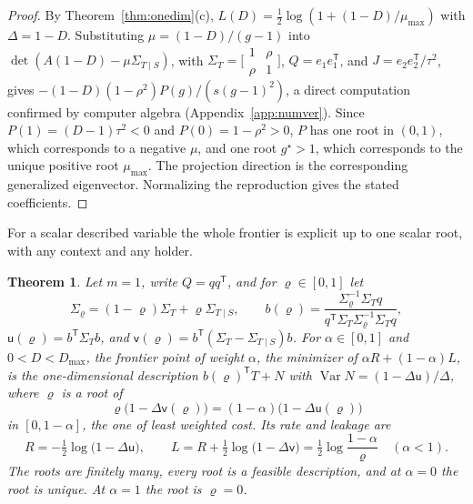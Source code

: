 \documentclass[11pt,onecolumn]{IEEEtran}
\newtheorem{theorem}{Theorem}
\newcommand{\Var}{\operatorname{Var}}
\newcommand{\Kc}{\Sigma_{T\mid S}}
\begin{document}
\begin{proof}
By Theorem~\ref{thm:onedim}(c), $L(D)=\tfrac12\log(1+(1-D)/\mu_{\max})$
with $\Delta=1-D$. Substituting $\mu=(1-D)/(g-1)$ into
$\det(A(1-D)-\mu\Kc)$, with $\Sigma_T=\bigl[\begin{smallmatrix}1&\rho\\ \rho&1\end{smallmatrix}\bigr]$,
$Q=e_1e_1^{\mathsf T}$, and $J=e_2e_2^{\mathsf T}/\tau^2$, gives
$-(1-D)(1-\rho^2)P(g)/(s(g-1)^2)$, a direct computation confirmed by
computer algebra (Appendix~\ref{app:numver}). Since $P(1)=(D-1)\tau^2<0$
and $P(0)=1-\rho^2>0$, $P$ has one root in $(0,1)$, which corresponds to
a negative $\mu$, and one root $g^\star>1$, which corresponds to the
unique positive root $\mu_{\max}$. The projection direction is the
corresponding generalized eigenvector. Normalizing the reproduction
gives the stated coefficients.
\end{proof}

For a scalar described variable the whole frontier is explicit up to
one scalar root, with any context and any holder.

\begin{theorem}\label{thm:scalarpath}
Let $m=1$, write $Q=qq^{\mathsf T}$, and for $\varrho\in[0,1]$ let
\[
\Sigma_\varrho=(1-\varrho)\Sigma_T+\varrho\Kc,\qquad
b(\varrho)=\frac{\Sigma_\varrho^{-1}\Sigma_Tq}{q^{\mathsf T}\Sigma_T\Sigma_\varrho^{-1}\Sigma_Tq},
\]
$\mathsf u(\varrho)=b^{\mathsf T}\Sigma_Tb$, and $\mathsf v(\varrho)=b^{\mathsf T}(\Sigma_T-\Kc)b$.
For $\alpha\in[0,1]$ and $0<D<D_{\max}$, the frontier point of weight
$\alpha$, the minimizer of $\alpha R+(1-\alpha)L$, is the one-dimensional
description $b(\varrho)^{\mathsf T}T+N$ with $\Var N=(1-\Delta\mathsf u)/\Delta$,
where $\varrho$ is a root of
\begin{equation}
\varrho\bigl(1-\Delta\mathsf v(\varrho)\bigr)=(1-\alpha)\bigl(1-\Delta\mathsf u(\varrho)\bigr)
\label{eq:scalarpath}
\end{equation}
in $[0,1-\alpha]$, the one of least weighted cost. Its rate and leakage
are
\[
R=-\tfrac12\log\bigl(1-\Delta\mathsf u\bigr),\qquad
L=R+\tfrac12\log\bigl(1-\Delta\mathsf v\bigr)=\tfrac12\log\frac{1-\alpha}{\varrho}\quad(\alpha<1).
\]
The roots are finitely many, every root is a feasible description, and
at $\alpha=0$ the root is unique. At $\alpha=1$ the root is $\varrho=0$.
\end{theorem}
\end{document}
